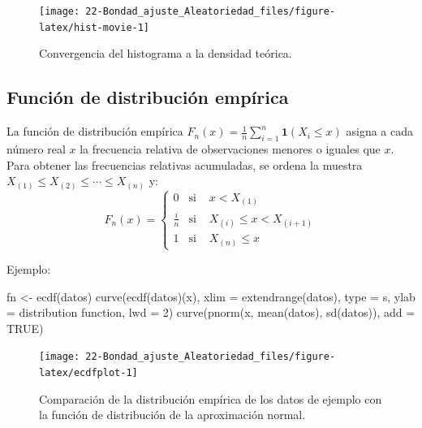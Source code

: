 \documentclass[
]{book}
\newenvironment{Shaded}{\begin{snugshade}}{\end{snugshade}}
\newcommand{\AttributeTok}[1]{\textcolor[rgb]{0.77,0.63,0.00}{#1}}
\newcommand{\ConstantTok}[1]{\textcolor[rgb]{0.00,0.00,0.00}{#1}}
\newcommand{\DecValTok}[1]{\textcolor[rgb]{0.00,0.00,0.81}{#1}}
\newcommand{\FunctionTok}[1]{\textcolor[rgb]{0.00,0.00,0.00}{#1}}
\newcommand{\NormalTok}[1]{#1}
\newcommand{\OtherTok}[1]{\textcolor[rgb]{0.56,0.35,0.01}{#1}}
\newcommand{\StringTok}[1]{\textcolor[rgb]{0.31,0.60,0.02}{#1}}
\theoremstyle{break}
\theoremstyle{nonumberplain}
\begin{document}
\begin{figure}[!htb]

{\centering \texttt{[image: 22-Bondad\_ajuste\_Aleatoriedad\_files/figure-latex/hist-movie-1]} 

}

\caption{Convergencia del histograma a la densidad teórica.}\label{fig:hist-movie}
\end{figure}

\hypertarget{empdistr}{%
\subsection{Función de distribución empírica}\label{empdistr}}

La función de distribución empírica \(F_n\left( x \right)=\frac{1}{n}\sum_{i=1}^{n}\mathbf{1}\left( X_i\leq x\right)\) asigna a cada número real \(x\) la frecuencia relativa de observaciones menores o iguales que \(x\).
Para obtener las frecuencias relativas acumuladas, se ordena la muestra \(X_{(1)}\leq X_{(2)}\leq \cdots \leq X_{(n)}\) y:
\[F_n(x)=\left \{
\begin{array}{cll}
0 & \text{si } &x<X_{\left(  1\right)  }\\
\tfrac{i}n & \text{si } & X_{\left(  i\right)  }\leq x<X_{\left(  i+1\right)  }\\
1 & \text{si } & X_{\left(  n\right)  }\leq x
\end{array}
\right.\]

Ejemplo:

\begin{Shaded}
\begin{Highlighting}[]
\NormalTok{fn }\OtherTok{\textless{}{-}} \FunctionTok{ecdf}\NormalTok{(datos)}
\FunctionTok{curve}\NormalTok{(}\FunctionTok{ecdf}\NormalTok{(datos)(x), }\AttributeTok{xlim =} \FunctionTok{extendrange}\NormalTok{(datos), }\AttributeTok{type =} \StringTok{\textquotesingle{}s\textquotesingle{}}\NormalTok{, }
      \AttributeTok{ylab =} \StringTok{\textquotesingle{}distribution function\textquotesingle{}}\NormalTok{, }\AttributeTok{lwd =} \DecValTok{2}\NormalTok{)}
\FunctionTok{curve}\NormalTok{(}\FunctionTok{pnorm}\NormalTok{(x, }\FunctionTok{mean}\NormalTok{(datos), }\FunctionTok{sd}\NormalTok{(datos)), }\AttributeTok{add =} \ConstantTok{TRUE}\NormalTok{)}
\end{Highlighting}
\end{Shaded}

\begin{figure}[!htb]

{\centering \texttt{[image: 22-Bondad\_ajuste\_Aleatoriedad\_files/figure-latex/ecdfplot-1]} 

}

\caption{Comparación de la distribución empírica de los datos de ejemplo con la función de distribución de la aproximación normal.}\label{fig:ecdfplot}
\end{figure}
\end{document}
